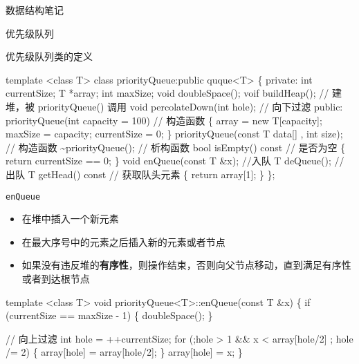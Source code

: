 \documentclass[
  ignorenonframetext,
]{beamer}
\newenvironment{Shaded}{}{}
\newcommand{\NormalTok}[1]{#1}
\providecommand{\tightlist}{%
  \setlength{\itemsep}{0pt}\setlength{\parskip}{0pt}}
\begin{document}
\begin{frame}[fragile]{数据结构笔记}
\begin{block}{优先级队列}
\begin{block}{优先级队列类的定义}
\protect{}\label{ux4f18ux5148ux7ea7ux961fux5217ux7c7bux7684ux5b9aux4e49}
\begin{Shaded}
\begin{Highlighting}[]
\NormalTok{template \textless{}class T\textgreater{}}
\NormalTok{class priorityQueue:public quque\textless{}T\textgreater{}}
\NormalTok{\{}
\NormalTok{  private:}
\NormalTok{    int currentSize;}
\NormalTok{    T *array;}
\NormalTok{    int maxSize;}
\NormalTok{    void doubleSpace();}
\NormalTok{    voif buildHeap();  // 建堆，被 priorityQueue() 调用}
\NormalTok{    void percolateDown(int hole); // 向下过滤}
\NormalTok{  public:}
\NormalTok{    priorityQueue(int capacity = 100) // 构造函数}
\NormalTok{    \{}
\NormalTok{      array = new T[capacity];}
\NormalTok{      maxSize = capacity;}
\NormalTok{      currentSize = 0;}
\NormalTok{    \}}
\NormalTok{    priorityQueue(const T data[] , int size); // 构造函数}
\NormalTok{    \textasciitilde{}priorityQueue(); // 析构函数}
\NormalTok{    bool isEmpty() const // 是否为空}
\NormalTok{    \{}
\NormalTok{      return currentSize == 0;}
\NormalTok{    \}}
\NormalTok{    void enQueue(const T \&x); //入队}
\NormalTok{    T deQueue(); // 出队}
\NormalTok{    T getHead() const // 获取队头元素}
\NormalTok{    \{}
\NormalTok{      return array[1];}
\NormalTok{    \}}
\NormalTok{\};}
\end{Highlighting}
\end{Shaded}

\begin{block}{\texttt{enQueue}}
\protect{}\label{enqueue-2}
\begin{itemize}
\tightlist
\item
  在堆中插入一个新元素
\item
  在最大序号中的元素之后插入新的元素或者节点
\item
  如果没有违反堆的\textbf{有序性}，则操作结束，否则向父节点移动，直到满足有序性或者到达根节点
\end{itemize}

\begin{Shaded}
\begin{Highlighting}[]
\NormalTok{template \textless{}class T\textgreater{}}
\NormalTok{void priorityQueue\textless{}T\textgreater{}::enQueue(const T \&x)}
\NormalTok{\{}
\NormalTok{  if (currentSize == maxSize {-} 1)}
\NormalTok{  \{}
\NormalTok{    doubleSpace();}
\NormalTok{  \}}

\NormalTok{  // 向上过滤}
\NormalTok{  int hole = ++currentSize;}
\NormalTok{  for (;hole \textgreater{} 1 \&\& x \textless{} array[hole/2] ; hole /= 2)}
\NormalTok{  \{}
\NormalTok{    array[hole] = array[hole/2];}
\NormalTok{  \}}
\NormalTok{  array[hole] = x;}
\NormalTok{\}}
\end{Highlighting}
\end{Shaded}


\end{block}
\end{block}
\end{block}
\end{frame}
\end{document}
